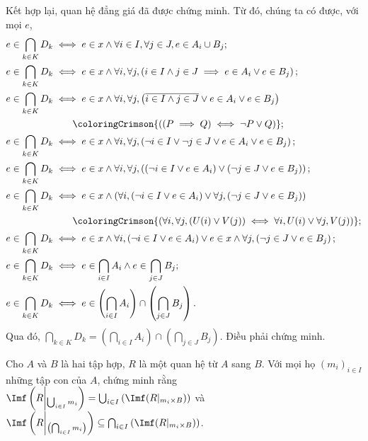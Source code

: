 Kết hợp lại, quan hệ đẳng giá đã được chứng minh. Từ đó, chúng ta có được, với mọi $e$,
\begin{align*}
   e \in \bigcap_{k \in K} D_k &\iff e \in x \land \forall i \in I, \forall j \in J, e \in A_i \cup B_j; \\
   e \in \bigcap_{k \in K} D_k &\iff e \in x \land \forall i, \forall j, \left(i \in I \land j \in J \implies e \in A_i \lor e \in B_j\right); \\
   e \in \bigcap_{k \in K} D_k &\iff e \in x \land \forall i, \forall j, \left(\overline{i \in I \land j \in J} \lor e \in A_i \lor e \in B_j\right) \\
   &\qquad\coloringCrimson{\left((P \implies Q) \iff \neg P \lor Q\right)}; \\
   e \in \bigcap_{k \in K} D_k &\iff e \in x \land \forall i, \forall j, \left(\neg i \in I \lor \neg j \in J \lor e \in A_i \lor e \in B_j\right); \\
   e \in \bigcap_{k \in K} D_k &\iff e \in x \land \forall i, \forall j, \left( \left(\neg i \in I \lor e \in A_i\right) \lor \left(\neg j \in J \lor e \in B_j\right) \right); \\
   e \in \bigcap_{k \in K} D_k &\iff e \in x \land \left(\forall i, \left(\neg i \in I \lor e \in A_i\right) \lor \forall j, \left(\neg j \in J \lor e \in B_j\right) \right) \\
   &\qquad\coloringCrimson{\left(\forall i, \forall j, (U(i) \lor V(j)) \iff \forall i, U(i) \lor \forall j, V(j)\right)}; \\
   e \in \bigcap_{k \in K} D_k &\iff e \in x \land \forall i, \left(\neg i \in I \lor e \in A_i\right) \lor e \in x \land \forall j, \left(\neg j \in J \lor e \in B_j\right); \\
   e \in \bigcap_{k \in K} D_k &\iff e \in \bigcap_{i \in I} A_i \land e \in \bigcap_{j \in J} B_j; \\
   e \in \bigcap_{k \in K} D_k &\iff e \in \left(\bigcap_{i \in I} A_i\right) \cap \left(\bigcap_{j \in J} B_j\right).
\end{align*}
Qua đó, $\bigcap_{k \in K} D_k = \left(\bigcap_{i \in I} A_i\right) \cap \left(\bigcap_{j \in J} B_j\right)$. Điều phải chứng minh.

\exercise Cho $A$ và $B$ là hai tập hợp, $R$ là một quan hệ từ $A$ sang $B$. Với mọi họ $(m_i)_{i \in I}$ những tập con của $A$, chứng minh rằng $\Imf \left(R\middle|_{\bigcup_{i \in I}m_i} \right) = \bigcup_{i \in I} \left(\Imf(R|_{m_i \times B})\right)$ và $\Imf \left(R\middle|_{\left(\bigcap_{i \in I}m_i\right)} \right) \subseteq \bigcap_{i \in I} \left(\Imf(R|_{m_i \times B})\right)$.

